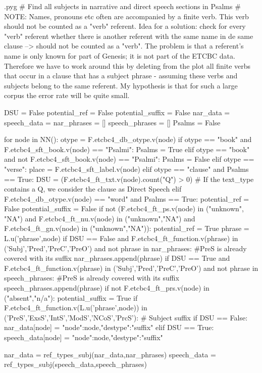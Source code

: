 \documentclass{report}
\makeatletter
\newenvironment{python}{%
  \VerbatimEnvironment
  \minted@resetoptions
  \setkeys{minted@opt}{}
      \begin{VerbatimOut}{\jobname.pyg}}
{%
      \end{VerbatimOut}
      \minted@pygmentize{python}
      \DeleteFile{\jobname.pyg}}
\makeatother
\begin{document}
\begin{python}
# Find all subjects in narrative and direct speech sections in Psalms 
# NOTE: Names, pronouns etc often are accompanied by a finite verb. This verb should not be counted as a "verb" referent. Idea for a solution: check for every "verb" referent whether there is another referent with the same name in de same clause --> should not be counted as a "verb". The problem is that a referent's name is only known for part of Genesis; it is not part of the ETCBC data. Therefore we have to work around this by deleting from the plot all finite verbs that occur in a clause that has a subject phrase - assuming these verbs and subjects belong to the same referent. My hypothesis is that for such a large corpus the error rate will be quite small.

DSU = False
potential_ref = False
potential_suffix = False
nar_data = {}
speech_data = {}
nar_phrases = []
speech_phrases = []
Psalms = False

for node in NN():
    otype = F.etcbc4_db_otype.v(node)
    if otype == "book" and F.etcbc4_sft_book.v(node) == "Psalmi":
        Psalms = True
    elif otype == "book" and not F.etcbc4_sft_book.v(node) == "Psalmi":
        Psalms = False
    elif otype == "verse":
        place = F.etcbc4_sft_label.v(node)
    elif otype == "clause" and Psalms == True:
        DSU = (F.etcbc4_ft_txt.v(node).count("Q") > 0)    # If the text_type contains a Q, we consider the clause as Direct Speech
    elif F.etcbc4_db_otype.v(node) == "word" and Psalms == True:
        potential_ref = False
        potential_suffix = False
        if not (F.etcbc4_ft_ps.v(node) in ("unknown", "NA") and F.etcbc4_ft_nu.v(node) in ("unknown","NA") and F.etcbc4_ft_gn.v(node) in ("unknown","NA")):
            potential_ref = True
            phrase = L.u('phrase',node)
            if DSU == False and F.etcbc4_ft_function.v(phrase) in ('Subj','Pred','PreC','PreO') and not phrase in nar_phrases: #PreS is already covered with its suffix
                nar_phrases.append(phrase)
            if DSU == True and F.etcbc4_ft_function.v(phrase) in ('Subj','Pred','PreC','PreO') and not phrase in speech_phrases: #PreS is already covered with its suffix
                speech_phrases.append(phrase) 
        if not F.etcbc4_ft_prs.v(node) in ("absent","n/a"):
            potential_suffix = True
            if F.etcbc4_ft_function.v(L.u('phrase',node)) in ('PreS','ExsS','IntS','ModS','NCoS','PrcS'): # Subject suffix
                if DSU == False:
                    nar_data[node] = {"node":node,"destype":"suffix"}
                elif DSU == True:
                    speech_data[node] = {"node":node,"destype":"suffix"}

nar_data = ref_types_subj(nar_data,nar_phrases)
speech_data = ref_types_subj(speech_data,speech_phrases)

\end{python}
\end{document}
